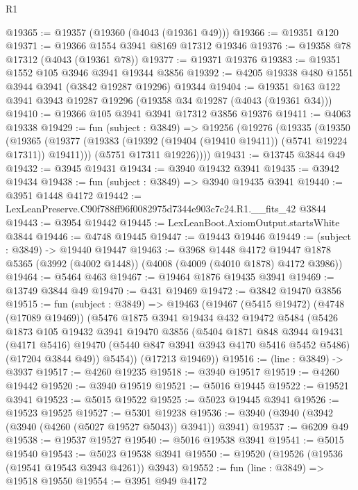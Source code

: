 \begin{lexlean}{R1}
\begin{coremodule}
@19365 := @19357 (@19360 (@4043 (@19361 @49)))
@19366 := @19351 @120
@19371 := @19366 @1554 @3941 @8169 @17312 @19346
@19376 := @19358 @78 @17312 (@4043 (@19361 @78))
@19377 := @19371 @19376
@19383 := @19351 @1552 @105 @3946 @3941 @19344 @3856
@19392 := @4205 @19338 @480 @1551 @3944 @3941 (@3842 @19287 @19296) @19344
@19404 := @19351 @163 @122 @3941 @3943 @19287 @19296 (@19358 @34 @19287 (@4043 (@19361 @34)))
@19410 := @19366 @105 @3941 @3941 @17312 @3856 @19376
@19411 := @4063 @19338
@19429 := fun (subject : @3849) =>
  @19256
    (@19276
      (@19335
        (@19350
          (@19365 (@19377 (@19383 (@19392 (@19404 (@19410 @19411)) (@5741 @19224 @17311)) @19411)))
          (@5751 @17311 @19226))))
@19431 := @13745 @3844 @49
@19432 := @3945 @19431
@19434 := @3940 @19432 @3941
@19435 := @3942 @19434
@19438 := fun (subject : @3849) => @3940 @19435 @3941
@19440 := @3951 @1448 @4172
@19442 := LexLeanPreserve.C90f788ff96f0082975d7344e903c7c24.R1.__fits_42 @3844
@19443 := @3954 @19442
@19445 := LexLeanBoot.AxiomOutput.startsWhite @3844
@19446 := @4748 @19445
@19447 := @19443 @19446
@19449 := (subject : @3849) -> @19440 @19447
@19463 := @3968
    @1448
    @4172
    @19447
    @1878
    @5365
    (@3992 (@4002 @1448))
    (@4008 (@4009 (@4010 @1878) @4172 @3986))
@19464 := @5464 @463
@19467 := @19464 @1876 @19435 @3941
@19469 := @13749 @3844 @49
@19470 := @431 @19469
@19472 := @3842 @19470 @3856
@19515 := fun (subject : @3849) =>
  @19463
    (@19467
      (@5415 @19472)
      (@4748 (@17089 @19469))
      (@5476
        @1875
        @3941
        @19434
        @432
        @19472
        @5484
        (@5426
          @1873
          @105
          @19432
          @3941
          @19470
          @3856
          (@5404
            @1871
            @848
            @3944
            @19431
            (@4171 @5416)
            @19470
            (@5440 @847 @3941 @3943 @4170 @5416 @5452 @5486)
            (@17204 @3844 @49))
          @5454))
      (@17213 @19469))
@19516 := (line : @3849) -> @3937
@19517 := @4260 @19235
@19518 := @3940 @19517
@19519 := @4260 @19442
@19520 := @3940 @19519
@19521 := @5016 @19445
@19522 := @19521 @3941
@19523 := @5015 @19522
@19525 := @5023 @19445 @3941
@19526 := @19523 @19525
@19527 := @5301 @19238
@19536 := @3940 (@3940 (@3942 (@3940 (@4260 (@5027 @19527 @5043)) @3941)) @3941)
@19537 := @6209 @49
@19538 := @19537 @19527
@19540 := @5016 @19538 @3941
@19541 := @5015 @19540
@19543 := @5023 @19538 @3941
@19550 := @19520 (@19526 (@19536 (@19541 @19543 @3943 @4261)) @3943)
@19552 := fun (line : @3849) => @19518 @19550
@19554 := @3951 @949 @4172

\end{coremodule}
\end{lexlean}
